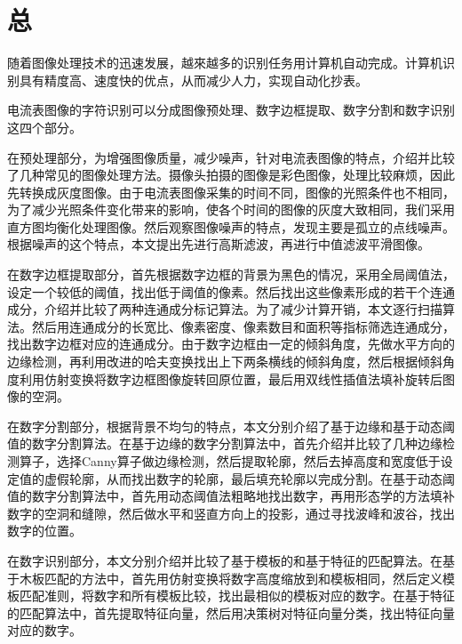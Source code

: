 
\chapter*{总}

随着图像处理技术的迅速发展，越來越多的识别任务用计算机自动完成。计算机识别具有精度高、速度快的优点，从而减少人力，实现自动化抄表。

电流表图像的字符识别可以分成图像预处理、数字边框提取、数字分割和数字识别这四个部分。

在预处理部分，为增强图像质量，减少噪声，针对电流表图像的特点，介绍并比较了几种常见的图像处理方法。摄像头拍摄的图像是彩色图像，处理比较麻烦，因此先转换成灰度图像。由于电流表图像采集的时间不同，图像的光照条件也不相同，为了减少光照条件变化带来的影响，使各个时间的图像的灰度大致相同，我们采用直方图均衡化处理图像。然后观察图像噪声的特点，发现主要是孤立的点线噪声。根据噪声的这个特点，本文提出先进行高斯滤波，再进行中值滤波平滑图像。

在数字边框提取部分，首先根据数字边框的背景为黑色的情况，采用全局阈值法，设定一个较低的阈值，找出低于阈值的像素。然后找出这些像素形成的若干个连通成分，介绍并比较了两种连通成分标记算法。为了减少计算开销，本文逐行扫描算法。然后用连通成分的长宽比、像素密度、像素数目和面积等指标筛选连通成分，找出数字边框对应的连通成分。由于数字边框由一定的倾斜角度，先做水平方向的边缘检测，再利用改进的哈夫变换找出上下两条横线的倾斜角度，然后根据倾斜角度利用仿射变换将数字边框图像旋转回原位置，最后用双线性插值法填补旋转后图像的空洞。

在数字分割部分，根据背景不均匀的特点，本文分别介绍了基于边缘和基于动态阈值的数字分割算法。在基于边缘的数字分割算法中，首先介绍并比较了几种边缘检测算子，选择Canny算子做边缘检测，然后提取轮廓，然后去掉高度和宽度低于设定值的虚假轮廓，从而找出数字的轮廓，最后填充轮廓以完成分割。在基于动态阈值的数字分割算法中，首先用动态阈值法粗略地找出数字，再用形态学的方法填补数字的空洞和缝隙，然后做水平和竖直方向上的投影，通过寻找波峰和波谷，找出数字的位置。

在数字识别部分，本文分别介绍并比较了基于模板的和基于特征的匹配算法。在基于木板匹配的方法中，首先用仿射变换将数字高度缩放到和模板相同，然后定义模板匹配准则，将数字和所有模板比较，找出最相似的模板对应的数字。在基于特征的匹配算法中，首先提取特征向量，然后用决策树对特征向量分类，找出特征向量对应的数字。
